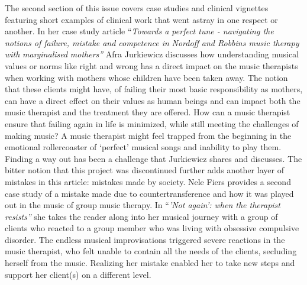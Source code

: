 \documentclass[authordate, empirical, issue]{jote-new-article}
\begin{document}
The second section of this issue covers case studies and clinical vignettes featuring short examples of clinical work that went astray in one respect or another. In her case study article “\emph{Towards a perfect tune - navigating the notions of failure, mistake and competence in }\emph{Nordoff}\emph{ and Robbins music therapy with }\emph{marginalised}\emph{ mothers” }Afra Jurkiewicz discusses how understanding musical values or norms like right and wrong has a direct impact on the music therapists when working with mothers whose children have been taken away. The notion that these clients might have, of failing their most basic responsibility as mothers, can have a direct effect on their values as human beings and can impact both the music therapist and the treatment they are offered. How can a music therapist ensure that failing again in life is minimized, while still meeting the challenges of making music? A music therapist might feel trapped from the beginning in the emotional rollercoaster of ‘perfect' musical songs and inability to play them. Finding a way out has been a challenge that Jurkiewicz shares and discusses. The bitter notion that this project was discontinued further adds another layer of mistakes in this article: mistakes made by society. Nele Fiers provides a second case study of a mistake made due to countertransference and how it was played out in the music of group music therapy. In “\emph{'Not again': when the therapist resists”} she takes the reader along into her musical journey with a group of clients who reacted to a group member who was living with obsessive compulsive disorder. The endless musical improvisations triggered severe reactions in the music therapist, who felt unable to contain all the needs of the clients, secluding herself from the music. Realizing her mistake enabled her to take new steps and support her client(s) on a different level.
\end{document}
